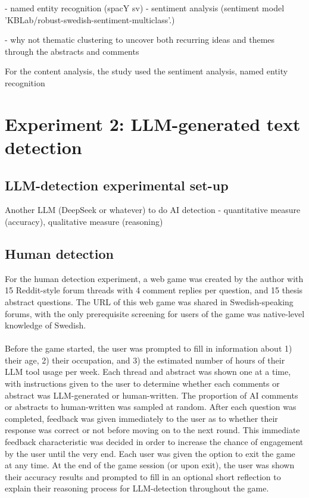 \documentclass[thesis]{cluu}
\begin{document}
- named entity recognition (spacY sv)
- sentiment analysis (sentiment model 'KBLab/robust-swedish-sentiment-multiclass'.)

- why not thematic clustering to uncover both recurring ideas and themes through the abstracts and comments


For the content analysis, the study used the sentiment analysis,
named entity recognition

\section{Experiment 2: LLM-generated text detection}


\subsection{LLM-detection experimental set-up}

Another LLM (DeepSeek or whatever) to do AI detection -
quantitative measure (accuracy), qualitative measure (reasoning)

\subsection{Human detection} 
For the human detection experiment, a web game was created by
the author with 15 Reddit-style forum threads with 4 comment
replies per question, and 15 thesis abstract questions. The URL
of this web game was shared in Swedish-speaking forums, with the
only prerequisite screening for users of the game was
native-level knowledge of Swedish.
\paragraph{}
Before the game started, the user was prompted to fill in
information about 1) their age, 2) their occupation, and 3) the
estimated number of hours of their LLM tool usage per week. Each
thread and abstract was shown one at a time, with instructions
given to the user to determine whether each comments or abstract
was LLM-generated or human-written. The proportion of AI
comments or abstracts to human-written was sampled at random.
After each question was completed, feedback was given
immediately to the user as to whether their response was correct
or not before moving on to the next round. This immediate
feedback characteristic was decided in order to increase the
chance of engagement by the user until the very end. Each user
was given the option to exit the game at any time. At the end of
the game session (or upon exit), the user was shown their
accuracy results and prompted to fill in an optional short
reflection to explain their reasoning process for LLM-detection
throughout the game.
\end{document}
